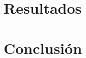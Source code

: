 \documentclass[12pt]{article}
\begin{document}
%
%
%
%
%
%


\newpage
\clearpage
\section{Resultados}


\newpage
\section{Conclusión}


\newpage


\end{document}

